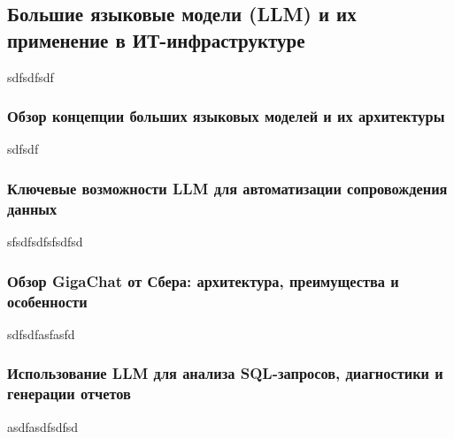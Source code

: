 \subsection{Большие языковые модели (LLM) и их применение в ИТ-инфраструктуре}

sdfsdfsdf

\subsubsection{Обзор концепции больших языковых моделей и их архитектуры}

sdfsdf

\subsubsection{Ключевые возможности LLM для автоматизации сопровождения данных}

sfsdfsdfsfsdfsd

\subsubsection{Обзор GigaChat от Сбера: архитектура, преимущества и особенности}

sdfsdfasfasfd

\subsubsection{Использование LLM для анализа SQL-запросов, диагностики и генерации отчетов}

asdfasdfsdfsd
